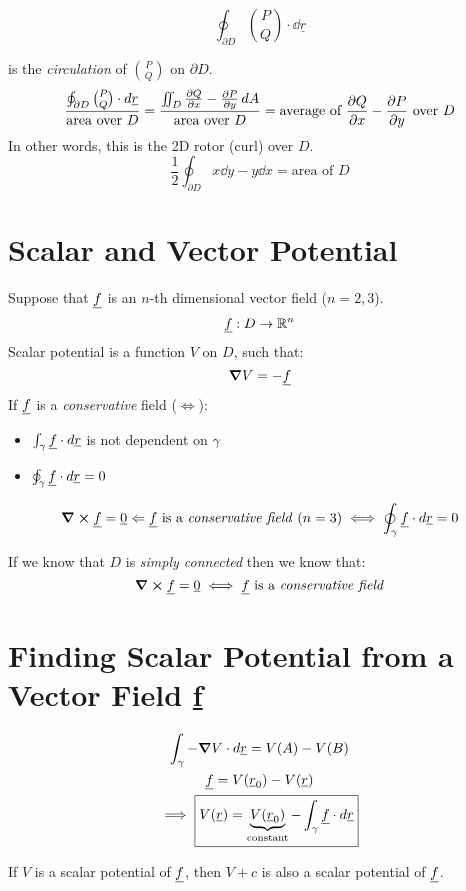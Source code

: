 \documentclass[00_complete]{subfiles}
\begin{document}
$$\oint_{\partial D}\binom{P}{Q}\cdot \dd{\underline r}$$

is the \emph{circulation} of $\binom{P}{Q}$ on $\partial D$.
$$\frac{\oint_{\partial D}\binom{P}{Q}\cdot \dd{\underline r}}{\text{area over
$D$}} = \frac{\iint_D\pdv{Q}{x}-\pdv{P}{y}\dd{A}}{\text{area over
$D$}}=\text{average of $\pdv{Q}{x}-\pdv{P}{y}$ over $D$}$$
In other words, this is the 2D rotor (curl) over $D$.
$$\frac{1}{2}\oint_{\partial D}x\dd{y}-y\dd{x}=\text{area of $D$}$$

\section{Scalar and Vector Potential}

Suppose that $\underline f$ is an $n$-th dimensional vector field ($n=2,3$).
$$\underline f: D \to \mathbb{R}^n$$
Scalar potential is a function $V$ on $D$, such that:
$$\grad V =-\underline f$$
If $\underline f$ is a \emph{conservative} field ($\iff$):
\begin{itemize}
    \item $\int_\gamma \underline f \cdot \dd{\underline r}$ is not dependent on $\gamma$
    \item $\oint_\gamma \underline f \cdot \dd{\underline r}=0$
\end{itemize}
$$\curl \underline f = \underline 0 \Leftarrow \text{$\underline f$ is a \emph{conservative
field} ($n=3$)} \iff \oint_\gamma \underline f \cdot \dd{\underline r} =0$$
\begin{note}
    If we know that $D$ is \emph{simply connected} then we know that:
    $$\curl \underline f = \underline 0 \iff \underline f \text{ is a \emph{conservative field}}$$
\end{note}
\section{Finding Scalar Potential from a Vector Field \texorpdfstring{\ul f}{f}}
\begin{gather*}
    \int_\gamma - \grad V \cdot \dd{\underline r} = V(A)-V(B) \\
    \underline f = V (\underline r_0) - V(\underline r) \\
    \implies \boxed{V(\underline r)= \underbrace{V(\underline r_0)}_{\text{constant}}- \int_\gamma \underline f \cdot \dd{\underline r}}
\end{gather*}
\begin{note}
    If $V$ is a scalar potential of $\underline f$, then $V+c$ is also a scalar
    potential of $\underline f$.
\end{note}
\end{document}
